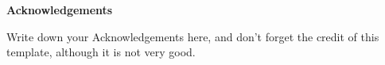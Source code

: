 \newpage
{}
\begin{center}
\thispagestyle{fancy}
\lhead{}
    \setlength{\parskip}{0pt}
    {\bf\Large{Acknowledgements} \par}
    \bigskip
\end{center}

\par Write down your Acknowledgements here, and don't forget the credit of this template, although it is not very good.

